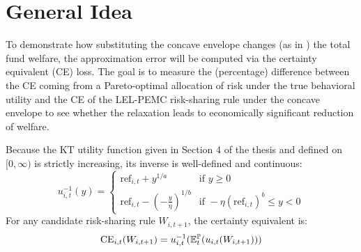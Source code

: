\section{General Idea}
\label{Sect:General_Idea}
To demonstrate how substituting the concave envelope changes (as in \citet{Dong2020}) the total fund welfare, the approximation error will be computed via the certainty equivalent (CE) loss. The goal is to measure the (percentage) difference between the CE coming from a Pareto-optimal allocation of risk under the true behavioral utility and the CE of the LEL-PEMC risk-sharing rule under the concave envelope to see whether the relaxation leads to economically significant reduction of welfare.

Because the KT utility function given in Section 4 of the thesis and defined on $[0, \infty)$ is strictly increasing, its inverse is well-defined and continuous:
\begin{equation*}
    u_{i,t}^{-1}(y) = \begin{cases} \text{ref}_{i,t} + y^{1/a} & \text{if } y \geq 0 \\ \text{ref}_{i,t} - \left( -\frac{y}{\eta} \right)^{1/b} & \text{if } -\eta (\text{ref}_{i,t})^b \leq y < 0 \end{cases}
\end{equation*}
For any candidate risk-sharing rule $W_{i,t+1}$, the certainty equivalent is:
\begin{equation*}
    \text{CE}_{i,t}(W_{i,t+1}) = u_{i,t}^{-1}(\mathbb{E}_t^{\mathbb{P}}(u_{i,t}(W_{i,t+1})))
\end{equation*}
